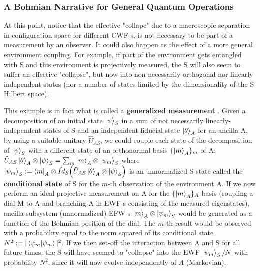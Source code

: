 \documentclass[11pt, a4paper]{article} %
\begin{document}
\subsubsection*{A Bohmian Narrative for General Quantum Operations}
At this point, notice that the effective-"collape" due to a macroscopic separation in configuration space for different CWF-s, is not necessary to be part of a measurement by an observer. It could also happen as the effect of a more general environment coupling. 
For example, if part of the environment gets entangled with S and this environment is projectively measured, the S will also seem to suffer an effective-"collapse", but now into non-necessarily orthogonal nor linearly-independent states (nor a number of states limited by the dimensionality of the S Hilbert space). 

This example is in fact what is called a {\bf generalized measurement} \cite{Generalized, Durr}. Given a decomposition of an initial state $\ket{\psi}_S$ in a sum of not necessarily linearly-independent states of S and an independent fiducial state $\ket{\theta}_A$ for an ancilla A, by using a suitable unitary $\hat{U}_{AS}$, we could couple each state of the decomposition of $\ket{\psi}_S$ with a different state of an orthonormal basis $\{\ket{m}_A\}_m$ of A: $\hat{U}_{AS}\ket{\theta}_A\otimes\ket{\psi}_S=\sum_m \ket{m}_A\otimes \ket{\psi_m}_S$ where $\ket{\psi_m}_S:=\bra{m}_A\otimes\hat{Id}_S \qty(\hat{U}_{AS}\ket{\theta}_A\otimes\ket{\psi}_S)$ is an unnormalized S state called the {\bf conditional state} of S for the $m$-th observation of the environment A. If we now perform an ideal projective measurement on A for the $\{\ket{m}_A\}_A$ basis (coupling a dial M to A and branching A in EWF-s consisting of the measured eigenstates), ancilla-subsystem (unnormalized) EFW-s $\ket{m}_A\otimes \ket{\psi_m}_S$ would be generated as a function of the Bohmian position of the dial. The $m$-th result would be observed with a probability equal to the norm squared of its conditional state $N^2:=|\bra{\psi_m}\ket{\psi_m}|^2$. If we then set-off the interaction between A and S for all future times, the S will have seemed to "collapse" into the EWF $\ket{\psi_m}_S/N$ with probability $N^2$, since it will now evolve independently of $A$ (Markovian).
\end{document}

